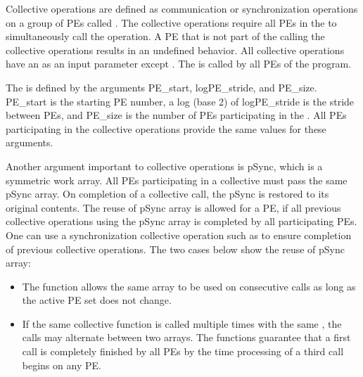 
Collective operations are defined as communication or synchronization operations 
on a group of \ac{PE}s called \activeset{}. The collective operations require all
\ac{PE}s in the \activeset{} to simultaneously call the operation. 
A \ac{PE} that is not part of the \activeset{} calling the collective 
operations results in an undefined behavior. All
collective operations have an \activeset{} as an input parameter except \barrierall{}. The \barrierall{} is called by all \ac{PE}s of the \openshmem{}
program. 

The \activeset{} is defined by the arguments PE\_start, logPE\_stride, 
and PE\_size. PE\_start is the starting \ac{PE} number, a log (base 2) of logPE\_stride 
is the stride between \ac{PE}s, and PE\_size is the number of \ac{PE}s 
participating in the \activeset{}. All \ac{PE}s participating in the 
collective operations provide the same values for these arguments. 
 
Another argument important to collective operations is pSync, which is a symmetric work 
array. All \ac{PE}s participating in a collective must pass the same
pSync array. On completion of a collective call, the pSync is restored to its 
original contents. The reuse of pSync array is allowed for a \ac{PE}, if all previous collective 
operations using the pSync array is completed by all participating 
\ac{PE}s. One can use a synchronization collective operation such as \barrier{}
to ensure completion of previous collective operations. The two cases below
show the reuse of pSync array:

\begin{itemize}
\item The  function allows the same  array to be used
          on consecutive calls as long as the active \ac{PE} set does not change.
\item  If the same collective function is called multiple times with the
          same \activeset, the calls may alternate between two  arrays.
          The \openshmem functions guarantee that a first call is completely finished by 
          all \ac{PE}s by the time processing of a third  call  begins  on
          any \ac{PE}.          
\end{itemize}


